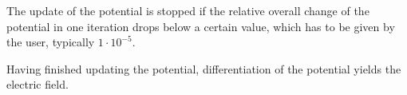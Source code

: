 The update of the potential is stopped if the relative overall change
of the potential in one iteration drops below a certain value, which
has to be given by the user, typically $1 \cdot 10^{-5}$.

Having finished updating the potential, differentiation of the potential yields the electric field.


